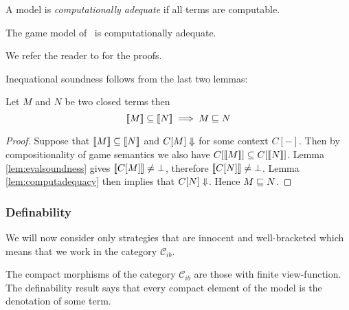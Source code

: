 A model is \emph{computationally adequate} if all
terms are computable.
\begin{lem}
\label{lem:computadequacy}
The game model of \pcf\ is
computationally adequate.
\end{lem}
We refer the reader to \cite{abramsky:game-semantics-tutorial} for
the proofs.

Inequational soundness follows from the last two lemmas:
\begin{prop}
\label{prop:ineqsoundness} Let $M$ and $N$ be two closed terms then
$${[\![ M ]\!]} \subseteq {[\![N ]\!]} \implies  M \sqsubseteq N $$
\end{prop}
\begin{proof}
  Suppose that ${[\![ M ]\!]} \subseteq {[\![N ]\!]}$ and $C[M] \Downarrow$ for some context $C[-]$. Then by compositionality of game semantics we also have
  $C[{[\![ M ]\!]}] \subseteq C[{[\![ N ]\!]}]$.
  Lemma \ref{lem:evalsoundness} gives ${[\![ C[M] ]\!]} \neq \bot$, therefore ${[\![ C[N] ]\!]} \neq \bot$.
  Lemma \ref{lem:computadequacy} then implies that $C[N] \Downarrow$.
  Hence $M \sqsubseteq N$.
\end{proof}

\subsubsection{Definability}

We will now consider only strategies that are innocent and
well-bracketed which means that we work in the category
$\mathcal{C}_{ib}$.

The compact morphisms of the category $\mathcal{C}_{ib}$ are those
with finite view-function. The definability result says that every
compact element of the model is the denotation of some term.

